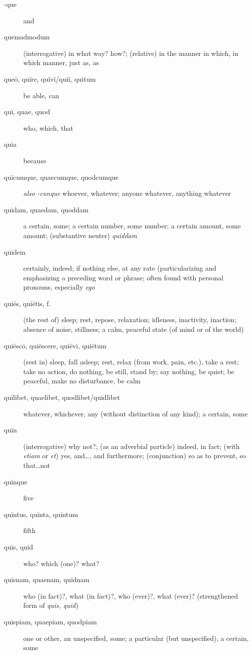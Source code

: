 \begin{description}
    \item[-que] \marginnote{*}and
    \item[quemadmodum] \marginnote{*}(interrogative) in what way? how?; (relative) in the manner in which, in which manner, just as, as
    \item[queō, quīre, quīvī/quiī, quitum] be able, can
    \item[quī, quae, quod] \marginnote{*}who, which, that
    \item[quia] \marginnote{*}because
    \item[quīcumque, quaecumque, quodcumque] \marginnote{*}\textit{also -cunque} whoever, whatever; anyone whatever, anything whatever
    \item[quīdam, quaedam, quoddam] a certain, some; a certain number, some number; a certain amount, some amount; (substantive neuter) \textit{quiddam}
    \item[quidem] \marginnote{*}certainly, indeed; if nothing else, at any rate (particularizing and emphasizing a preceding word or phrase; often found with personal pronouns, especially \textit{ego}
    \item[quiēs, quiētis, f.] (the rest of) sleep; rest, repose, relaxation; idleness, inactivity, inaction; absence of noise, stillness; a calm, peaceful state (of mind or of the world)
    \item[quiēscō, quiēscere, quiēvī, quiētum] \marginnote{*}(rest in) sleep, fall asleep; rest, relax (from work, pain, etc.), take a rest; take no action, do nothing, be still, stand by; say nothing, be quiet; be peaceful, make no disturbance, be calm
    \item[quīlibet, quaelibet, quodlibet/quidlibet] whatever, whichever, any (without distinction of any kind); a certain, some
    \item[quīn] \marginnote{*}(interrogative) why not?; (as an adverbial particle) indeed, in fact; (with \textit{etiam} or \textit{et}) yes, and\dots, and furthermore; (conjunction) so as to prevent, so that\dots not
    \item[quīnque] \marginnote{*}five
    \item[quīntus, quīnta, quīntum] fifth
    \item[quis, quid] \marginnote{*}who? which (one)? what?
    \item[quisnam, quaenam, quidnam] who (in fact)?, what (in fact)?, who (ever)?, what (ever)? (strengthened form of \textit{quis, quid})
    \item[quispiam, quaepiam, quodpiam] one or other, an unspecified, some; a particular (but unspecified), a certain, some

\end{description}
